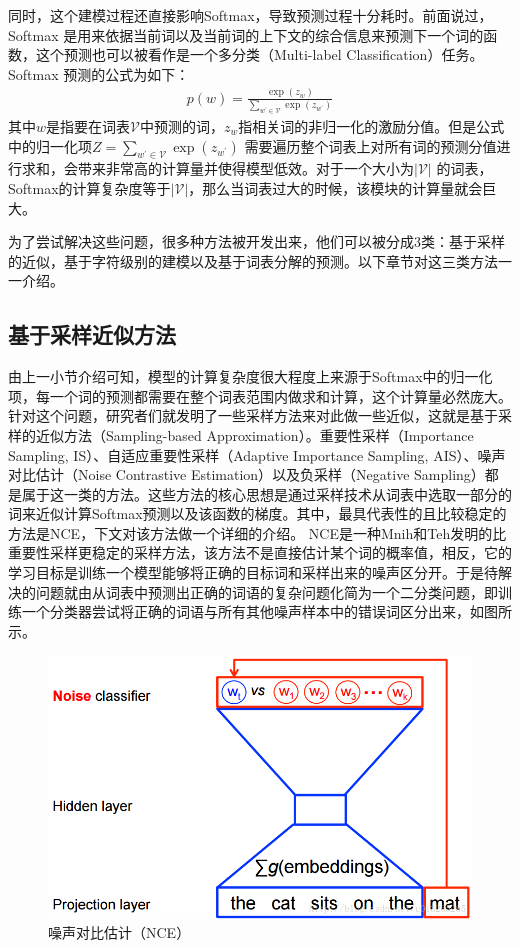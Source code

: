 \documentclass[12pt,a4paper]{article}
\begin{document}
同时，这个建模过程还直接影响Softmax，导致预测过程十分耗时。前面说过，Softmax 是用来依据当前词以及当前词的上下文的综合信息来预测下一个词的函数，这个预测也可以被看作是一个多分类（Multi-label Classification）任务。Softmax 预测的公式为如下：
\begin{equation}\label{eq:softmax}
\begin{split}
	p(w)=\frac{\exp(z_w)}{\sum_{w^{'}\in\mathcal{V}} {\exp(z_{w^{'}})}}
\end{split}
\end{equation}
其中$w$是指要在词表$\mathcal{V}$中预测的词，$z_w$指相关词的非归一化的激励分值。但是公式中的归一化项${Z=\sum_{w^{'}\in\mathcal{V}} {\exp(z_{w^{'}})}}$ 需要遍历整个词表上对所有词的预测分值进行求和，会带来非常高的计算量并使得模型低效。对于一个大小为${|\mathcal{V}|}$ 的词表，Softmax的计算复杂度等于${\mathcal{|\mathcal{V}|}}$，那么当词表过大的时候，该模块的计算量就会巨大。

为了尝试解决这些问题，很多种方法被开发出来，他们可以被分成3类：基于采样的近似，基于字符级别的建模以及基于词表分解的预测。以下章节对这三类方法一一介绍。

\subsection{基于采样近似方法}
由上一小节介绍可知，模型的计算复杂度很大程度上来源于Softmax中的归一化项，每一个词的预测都需要在整个词表范围内做求和计算，这个计算量必然庞大。针对这个问题，研究者们就发明了一些采样方法来对此做一些近似，这就是基于采样的近似方法（Sampling-based Approximation）。重要性采样（Importance Sampling, IS）\cite{DBLP:conf/aistats/BengioS03}、自适应重要性采样（Adaptive Importance Sampling, AIS）\cite{DBLP:journals/tnn/BengioS08}、噪声对比估计（Noise Contrastive Estimation）\cite{DBLP:journals/jmlr/GutmannH12,DBLP:conf/icml/MnihT12}以及负采样（Negative Sampling）\cite{DBLP:journals/corr/abs-1301-3781}都是属于这一类的方法。这些方法的核心思想是通过采样技术从词表中选取一部分的词来近似计算Softmax预测以及该函数的梯度。其中，最具代表性的且比较稳定的方法是NCE，下文对该方法做一个详细的介绍。
NCE是一种Mnih和Teh发明的比重要性采样更稳定的采样方法，该方法不是直接估计某个词的概率值，相反，它的学习目标是训练一个模型能够将正确的目标词和采样出来的噪声区分开。于是待解决的问题就由从词表中预测出正确的词语的复杂问题化简为一个二分类问题，即训练一个分类器尝试将正确的词语与所有其他噪声样本中的错误词区分出来，如图所示。
\begin{figure}
  \centering
  \includegraphics[width=0.6\linewidth]{./figures/nce.png}
  \caption{噪声对比估计（NCE）}\label{fig:nce}
\end{figure}
\end{document}
